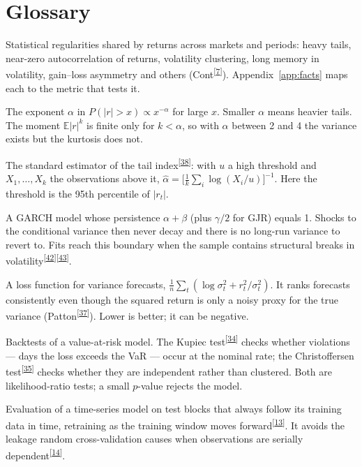 \documentclass[11pt,a4paper]{article}
\makeatletter
\newcommand{\tcite}[1]{\textsuperscript{[\hyperlink{R:#1}{#1}]}}
\DeclareRobustCommand{\_}{\ifmmode\nfss@text{\textunderscore}\else\textunderscore\allowbreak\fi}
\newcommand{\E}{\mathbb{E}}
\makeatother
\begin{document}
\section*{Glossary}
\label{sec:glossary}
\begin{description}[style=nextline,leftmargin=1.4em,itemsep=4pt,font=\sffamily\bfseries]
\item[Stylised facts] Statistical regularities shared by returns across markets and periods: heavy tails, near-zero autocorrelation of returns, volatility clustering, long memory in volatility, gain--loss asymmetry and others (Cont\tcite{7}). Appendix~\ref{app:facts} maps each to the metric that tests it.
\item[Tail index] The exponent $\alpha$ in $P(|r|>x)\propto x^{-\alpha}$ for large $x$. Smaller $\alpha$ means heavier tails. The moment $\E|r|^k$ is finite only for $k<\alpha$, so with $\alpha$ between 2 and 4 the variance exists but the kurtosis does not.
\item[Hill estimator] The standard estimator of the tail index\tcite{38}: with $u$ a high threshold and $X_1,\dots,X_k$ the observations above it, $\hat\alpha=\big[\frac1k\sum_i\log(X_i/u)\big]^{-1}$. Here the threshold is the 95th percentile of $|r_t|$.
\item[Integrated GARCH] A GARCH model whose persistence $\alpha+\beta$ (plus $\gamma/2$ for GJR) equals 1. Shocks to the conditional variance then never decay and there is no long-run variance to revert to. Fits reach this boundary when the sample contains structural breaks in volatility\tcite{42}\tcite{43}.
\item[QLIKE] A loss function for variance forecasts, $\frac1n\sum_t(\log\sigma_t^2+r_t^2/\sigma_t^2)$. It ranks forecasts consistently even though the squared return is only a noisy proxy for the true variance (Patton\tcite{37}). Lower is better; it can be negative.
\item[Kupiec and Christoffersen tests] Backtests of a value-at-risk model. The Kupiec test\tcite{34} checks whether violations --- days the loss exceeds the VaR --- occur at the nominal rate; the Christoffersen test\tcite{35} checks whether they are independent rather than clustered. Both are likelihood-ratio tests; a small $p$-value rejects the model.
\item[Walk-forward validation] Evaluation of a time-series model on test blocks that always follow its training data in time, retraining as the training window moves forward\tcite{13}. It avoids the leakage random cross-validation causes when observations are serially dependent\tcite{14}.

\end{description}
\end{document}
